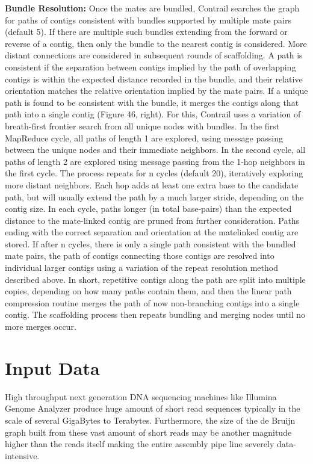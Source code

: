 \documentclass[conference]{IEEEtran}
\begin{document}
\textbf{Bundle Resolution:}
Once the mates are bundled, Contrail searches the graph for paths of contigs consistent with bundles supported by multiple mate pairs (default 5). If there are multiple such bundles extending from the forward or reverse of a contig, then only the bundle to the nearest contig is considered. More distant connections are considered in subsequent rounds of scaffolding. A path is consistent if the separation between contigs implied by the path of overlapping contigs is within the expected distance recorded in the bundle, and their relative orientation matches the relative orientation implied by the mate pairs. If a unique path is found to be consistent with
the bundle, it merges the contigs along that path into a single contig (Figure 46, right).  For this, Contrail uses a variation of breath-first frontier search from all unique nodes with bundles. In the first MapReduce cycle, all paths of length 1 are explored, using message passing between the unique nodes and their immediate neighbors. In the second cycle, all paths of length 2 are explored using message passing from the 1-hop neighbors in the first cycle. The process repeats for n cycles (default 20), iteratively exploring more distant neighbors. Each hop adds at least one extra base to the candidate path, but will usually extend the path by a much larger
stride, depending on the contig size. In each cycle, paths longer (in total base-pairs) than the expected distance to the mate-linked contig are pruned from further consideration. Paths ending with the correct separation and orientation at the matelinked contig are stored. If after n cycles, there is only a single path consistent with the bundled mate pairs, the path of contigs connecting those contigs are resolved into individual larger contigs using a variation of the repeat resolution method described above. In short, repetitive contigs along the path are split into multiple copies, depending on how many paths contain them, and then the linear path compression
routine merges the path of now non-branching contigs into a single contig. The scaffolding process then repeats bundling and merging nodes until no more merges occur.

\section {Input Data} \label{InputData}
High throughput next generation DNA sequencing machines like Illumina Genome Analyzer produce huge amount of short read sequences typically in the scale of several GigaBytes to Terabytes.
Furthermore, the size of the de Bruijn graph built from these vast amount of short reads may be another magnitude higher than the reads itself making the entire assembly pipe line severely data-intensive.
\end{document}
